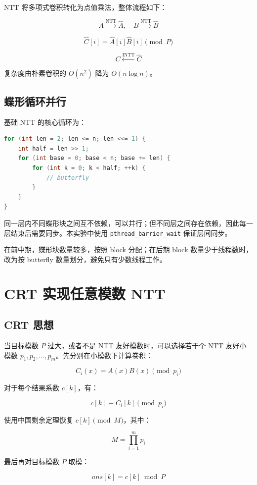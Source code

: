 \documentclass[UTF8,a4paper,12pt]{ctexart}
\begin{document}
NTT 将多项式卷积转化为点值乘法，整体流程如下：

\[
A \xrightarrow{\mathrm{NTT}} \hat{A},\quad
B \xrightarrow{\mathrm{NTT}} \hat{B}
\]

\[
\hat{C}[i]=\hat{A}[i]\hat{B}[i]\pmod P
\]

\[
C \xleftarrow{\mathrm{INTT}} \hat{C}
\]

复杂度由朴素卷积的 $O(n^2)$ 降为 $O(n\log n)$。

\subsection{蝶形循环并行}

基础 NTT 的核心循环为：

\begin{lstlisting}[language=C++]
for (int len = 2; len <= n; len <<= 1) {
    int half = len >> 1;
    for (int base = 0; base < n; base += len) {
        for (int k = 0; k < half; ++k) {
            // butterfly
        }
    }
}
\end{lstlisting}

同一层内不同蝶形块之间互不依赖，可以并行；但不同层之间存在依赖，因此每一层结束后需要同步。本实验中使用 \texttt{pthread\_barrier\_wait} 保证层间同步。

在前中期，蝶形块数量较多，按照 block 分配；在后期 block 数量少于线程数时，改为按 butterfly 数量划分，避免只有少数线程工作。

\section{CRT 实现任意模数 NTT}

\subsection{CRT 思想}

当目标模数 $P$ 过大，或者不是 NTT 友好模数时，可以选择若干个 NTT 友好小模数 $p_1,p_2,\ldots,p_m$。先分别在小模数下计算卷积：

\[
C_i(x)=A(x)B(x)\pmod {p_i}
\]

对于每个结果系数 $c[k]$，有：

\[
c[k]\equiv C_i[k]\pmod {p_i}
\]

使用中国剩余定理恢复 $c[k]\pmod M$，其中：

\[
M=\prod_{i=1}^{m}p_i
\]

最后再对目标模数 $P$ 取模：

\[
ans[k]=c[k]\bmod P
\]
\end{document}
